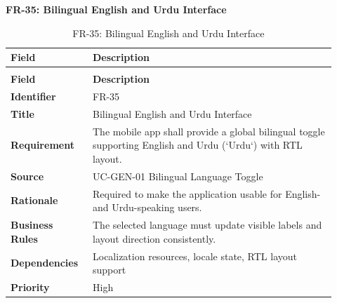 \documentclass[12pt,a4paper]{article}
\newcommand{\urduword}{Urdu}
\newcommand{\urduword}{Urdu}
\begin{document}
\noindent\textbf{FR-35: Bilingual English and Urdu Interface}\par
\vspace{4pt}
\begingroup\small\setlength{\tabcolsep}{4pt}\renewcommand{\arraystretch}{1.15}
\begin{longtable}{|>{\raggedright\arraybackslash}p{0.22\linewidth}|>{\raggedright\arraybackslash}p{0.70\linewidth}|}
\caption{FR-35: Bilingual English and Urdu Interface}\label{tab:fr-35}\\
\hline
\textbf{Field} & \textbf{Description} \\ \hline
\endfirsthead
\multicolumn{2}{c}{Table \thetable\ Bilingual English and Urdu Interface (continued)}\\
\hline
\textbf{Field} & \textbf{Description} \\ \hline
\endhead
\textbf{Identifier} & FR-35 \\ \hline
\textbf{Title} & Bilingual English and Urdu Interface \\ \hline
\textbf{Requirement} & The mobile app shall provide a global bilingual toggle supporting English and Urdu (`\urduword`) with RTL layout. \\ \hline
\textbf{Source} & UC-GEN-01 Bilingual Language Toggle \\ \hline
\textbf{Rationale} & Required to make the application usable for English- and Urdu-speaking users. \\ \hline
\textbf{Business Rules} & The selected language must update visible labels and layout direction consistently. \\ \hline
\textbf{Dependencies} & Localization resources, locale state, RTL layout support \\ \hline
\textbf{Priority} & High \\ \hline
\end{longtable}
\endgroup
\end{document}
